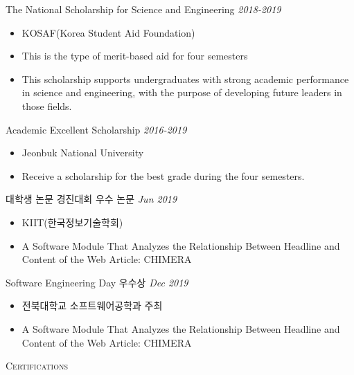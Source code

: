 \documentclass[10pt]{article}
\newenvironment{changemargin}[2]{
  \begin{list}{}{
    \setlength{\topsep}{0pt}
    \setlength{\leftmargin}{#1}
    \setlength{\rightmargin}{#2}
    \setlength{\listparindent}{\parindent}
    \setlength{\itemindent}{\parindent}
    \setlength{\parsep}{\parskip}
  }
  \item[]}{\end{list}
}
\newcommand{\lineover}{
	\begin{changemargin}{-0.05in}{-0.05in}
		\vspace*{-8pt}
		\hrulefill \\
		\vspace*{-2pt}
	\end{changemargin}
}
\newcommand{\header}[1]{
	\begin{changemargin}{-0.5in}{-0.5in}
		\scshape{#1}\\
  	\lineover
	\end{changemargin}
}
\newcommand{\award}[2]{
	{#1} \hfill \emph{#2}\\ \medskip
}
\newenvironment{body} {
	\vspace*{-16pt}
	\begin{changemargin}{-0.25in}{-0.5in}
  }
	{\end{changemargin}
}
\begin{document}
\begin{body}
	\vspace{14pt}

\award{The National Scholarship for Science and Engineering}{2018-2019}
\begin{itemize} \itemsep -0pt  %
      \item  KOSAF(Korea Student Aid Foundation)
      \item This is the type of merit-based aid for four semesters
      \item This scholarship supports undergraduates with strong academic performance in science and engineering, with the purpose of developing future leaders in those fields.
  	\end{itemize}
	
	\award{Academic Excellent Scholarship}{2016-2019}
\begin{itemize} \itemsep -0pt  %
      \item  Jeonbuk National University
      \item Receive a scholarship for the best grade during the four semesters.
  	\end{itemize}
	
	
	\award{대학생 논문 경진대회 우수 논문}{Jun 2019}
	\begin{itemize} \itemsep -0pt  %
		\item  KIIT(한국정보기술학회)
		\item A Software Module That Analyzes the Relationship Between Headline and Content of the Web Article: CHIMERA
  	\end{itemize}
	
	\award{Software Engineering Day 우수상}{Dec 2019}
	\begin{itemize} \itemsep -0pt  %
		\item  전북대학교 소프트웨어공학과 주최
		\item A Software Module That Analyzes the Relationship Between Headline and Content of the Web Article: CHIMERA
  	\end{itemize}

\end{body}


\medskip



\header{Certifications}
\end{document}
